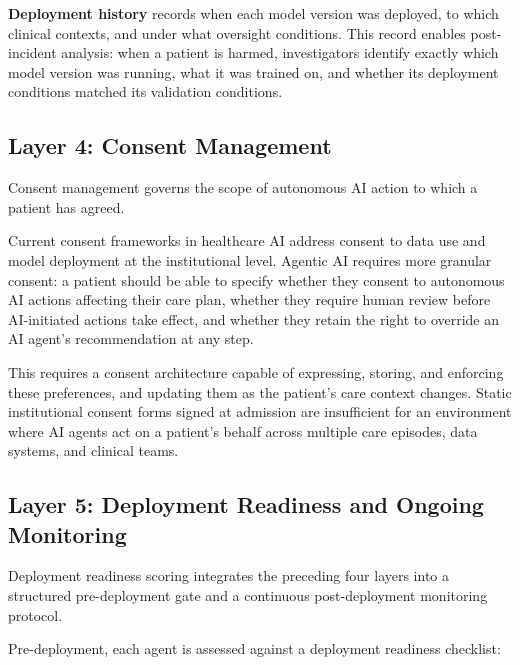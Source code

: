 \textbf{Deployment history} records when each model version was
deployed, to which clinical contexts, and under what oversight
conditions. This record enables post-incident analysis: when a patient
is harmed, investigators identify exactly which model version was
running, what it was trained on, and whether its deployment conditions
matched its validation conditions.

\subsection{Layer 4: Consent Management}\label{layer-4-consent-management}

Consent management governs the scope of autonomous AI action to which a
patient has agreed.

Current consent frameworks in healthcare AI address consent to data use
and model deployment at the institutional level. Agentic AI requires
more granular consent: a patient should be able to specify whether they
consent to autonomous AI actions affecting their care plan, whether they
require human review before AI-initiated actions take effect, and
whether they retain the right to override an AI agent's recommendation
at any step.

This requires a consent architecture capable of expressing, storing, and
enforcing these preferences, and updating them as the patient's care
context changes. Static institutional consent forms signed at admission
are insufficient for an environment where AI agents act on a patient's
behalf across multiple care episodes, data systems, and clinical teams.

\subsection{Layer 5: Deployment Readiness and Ongoing Monitoring}\label{layer-5-deployment-readiness-and-ongoing-monitoring}

Deployment readiness scoring integrates the preceding four layers into a
structured pre-deployment gate and a continuous post-deployment
monitoring protocol.

Pre-deployment, each agent is assessed against a deployment readiness
checklist:

